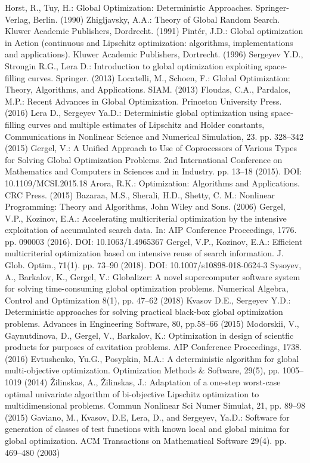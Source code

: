 \documentclass[smallextended]{svjour3}       %
\begin{document}
\begin{thebibliography}{}
 Horst, R., Tuy, H.: Global Optimization: Deterministic Approaches. Springer-Verlag, Berlin. (1990)
 Zhigljavsky, A.A.: Theory of Global Random Search. Kluwer Academic Publishers, Dordrecht. (1991)
 Pint\'er, J.D.: Global optimization in Action (continuous and Lipschitz optimization: algorithms, implementations and applications). Kluwer Academic Publishers, Dortrecht. (1996)
 Sergeyev Y.D., Strongin R.G., Lera D.: Introduction to global optimization exploiting space-filling curves. Springer. (2013)
 Locatelli, M., Schoen, F.: Global Optimization: Theory, Algorithms, and Applications. SIAM. (2013)
 Floudas, C.A., Pardalos, M.P.: Recent Advances in Global Optimization. Princeton University Press. (2016)
 Lera D., Sergeyev Ya.D.: Deterministic global optimization using space-filling curves and multiple estimates of Lipschitz and Holder constants, Communications in Nonlinear Science and Numerical Simulation, 23. pp. 328--342 (2015)
 Gergel, V.: A Unified Approach to Use of Coprocessors of Various Types for Solving Global Optimization Problems. 2nd International Conference on Mathematics and Computers in Sciences and in Industry. pp. 13--18 (2015). DOI: 10.1109/MCSI.2015.18
 Arora, R.K.: Optimization: Algorithms and Applications. CRC Press. (2015)
 Bazaraa, M.S., Sherali, H.D., Shetty, C. M.: Nonlinear Programming: Theory and Algorithms, John Wiley and Sons. (2006)
 Gergel, V.P., Kozinov, E.A.: Accelerating multicriterial optimization by the intensive exploitation of accumulated search data. In: AIP Conference Proceedings, 1776. pp. 090003 (2016). DOI: 10.1063/1.4965367
 Gergel, V.P., Kozinov, E.A.: Efficient multicriterial optimization based on intensive reuse of search information.  J. Glob. Optim., 71(1). pp. 73--90 (2018). DOI: 10.1007/s10898-018-0624-3
 Sysoyev, A., Barkalov, K., Gergel, V.: Globalizer: A novel supercomputer software system for solving time-consuming global optimization problems. Numerical Algebra, Control and Optimization 8(1), pp. 47--62 (2018)
 Kvasov D.E., Sergeyev Y.D.: Deterministic approaches for solving practical black-box global optimization problems. Advances in Engineering Software, 80, pp.58--66 (2015)
 Modorskii, V., Gaynutdinova, D., Gergel, V., Barkalov, K.: Optimization in design of scientfic products for purposes of cavitation problems. AIP Conference Proceedings, 1738. (2016)
 Evtushenko, Yu.G., Posypkin, M.A.: A deterministic algorithm for global multi-objective optimization. Optimization Methods \& Software, 29(5), pp. 1005--1019 (2014)
 {\v Z}ilinskas, A., {\v Z}ilinskas, J.: Adaptation of a one-step worst-case optimal univariate algorithm of bi-objective Lipschitz optimization to multidimensional problems. Commun Nonlinear Sci Numer Simulat, 21, pp. 89--98 (2015)
 Gaviano, M., Kvasov, D.E, Lera, D., and Sergeyev, Ya.D.: Software for generation of classes of test functions with known local and global minima for global optimization. ACM Transactions on Mathematical Software 29(4). pp. 469--480 (2003)

\end{thebibliography}
\end{document}
